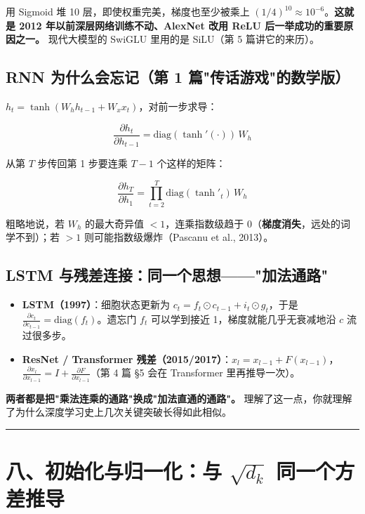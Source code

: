 用 Sigmoid 堆 10 层，即使权重完美，梯度也至少被乘上 $(1/4)^{10} \approx 10^{-6}$。\textbf{这就是 2012 年以前深层网络训练不动、AlexNet 改用 ReLU 后一举成功的重要原因之一。} 现代大模型的 SwiGLU 里用的是 SiLU（第 5 篇讲它的来历）。

\subsection{RNN 为什么会忘记（第 1 篇"传话游戏"的数学版）}

$h_t = \tanh(W_h h_{t-1} + W_x x_t)$，对前一步求导：

\[
\frac{\partial h_t}{\partial h_{t-1}} = \text{diag}(\tanh'(\cdot)) \, W_h
\]

从第 $T$ 步传回第 1 步要连乘 $T-1$ 个这样的矩阵：

\[
\frac{\partial h_T}{\partial h_1} = \prod_{t=2}^{T} \text{diag}(\tanh'_t) \, W_h
\]

粗略地说，若 $W_h$ 的最大奇异值 $< 1$，连乘指数级趋于 0（\textbf{梯度消失}，远处的词学不到）；若 $> 1$ 则可能指数级爆炸（Pascanu et al., 2013）。

\subsection{LSTM 与残差连接：同一个思想——"加法通路"}

\begin{itemize}
  \item \textbf{LSTM（1997）}：细胞状态更新为 $c_t = f_t \odot c_{t-1} + i_t \odot g_t$，于是 $\frac{\partial c_t}{\partial c_{t-1}} = \text{diag}(f_t)$。遗忘门 $f_t$ 可以学到接近 1，梯度就能几乎无衰减地沿 $c$ 流过很多步。
  \item \textbf{ResNet / Transformer 残差（2015/2017）}：$x_l = x_{l-1} + F(x_{l-1})$，$\frac{\partial x_l}{\partial x_{l-1}} = I + \frac{\partial F}{\partial x_{l-1}}$（第 4 篇 §5 会在 Transformer 里再推导一次）。
\end{itemize}

\textbf{两者都是把"乘法连乘的通路"换成"加法直通的通路"。} 理解了这一点，你就理解了为什么深度学习史上几次关键突破长得如此相似。

\vspace{0.8em}\hrule\vspace{0.8em}

\section{八、初始化与归一化：与 $\sqrt{d_k}$ 同一个方差推导}

